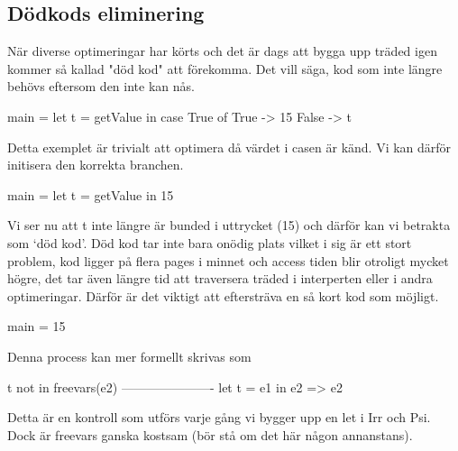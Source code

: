 \documentclass[../Optimise]{subfiles}
\begin{document}
\subsection{Dödkods eliminering}


När diverse optimeringar har körts och det är dags att bygga upp träded igen kommer
så kallad "död kod" att förekomma. Det vill säga, kod som inte längre behövs eftersom
den inte kan nås.

\begin{codeEx}
main = let t = getValue in
            case True of
               True  -> 15
               False -> t
\end{codeEx}

Detta exemplet är trivialt att optimera då värdet i casen är känd. Vi kan därför
initisera den korrekta branchen.


\begin{codeEx}
main = let t = getValue in 15
\end{codeEx}


Vi ser nu att t inte längre är bunded i uttrycket (15) och därför kan vi
 betrakta  som `död kod'. Död kod tar inte bara onödig plats
 vilket i sig är ett stort problem, kod ligger på flera pages i minnet och
 access tiden blir otroligt mycket högre, det tar även längre tid att traversera
 träded i interperten eller i andra optimeringar. Därför är det viktigt att
 eftersträva en så kort kod som möjligt.

\begin{codeEx}
main = 15
\end{codeEx}

Denna process kan mer formellt skrivas som

\begin{codeEx}
 t not in freevars(e2)
----------------------
let t = e1 in e2 => e2
\end{codeEx}

Detta är en kontroll som utförs varje gång vi bygger upp en let i Irr och Psi.
Dock är freevars ganska kostsam (bör stå om det här någon annanstans).
\end{document}
